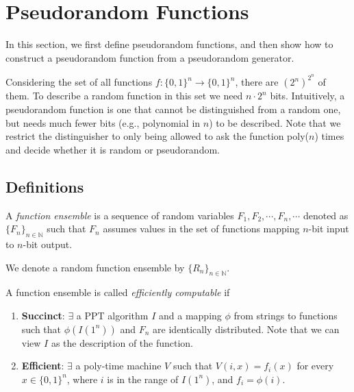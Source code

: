 \section{Pseudorandom Functions}
In this section, we first define pseudorandom functions, and then show how to  construct a pseudorandom function from a pseudorandom generator.

Considering the set of all functions $f: \{0, 1\}^n \rightarrow \{0, 1\}^n$, there are $(2^n)^{2^n}$ of them.
To describe a random function in this set we need $n \cdot 2^n$ bits.
Intuitively, a pseudorandom function is one that cannot be distinguished from a random one,
but needs much fewer bits (e.g., polynomial in $n$) to be described.
Note that we restrict the distinguisher to only being allowed to ask the function poly($n$) times and decide whether it is random or pseudorandom.

\subsection{Definitions}

\begin{definition}
A \emph{function ensemble} is a sequence of random variables $F_1, F_2, \cdots, F_n, \cdots$ denoted as $\{F_n\}_{n \in \mathbb{N}}$ such that
$F_n$ assumes values in the set of functions mapping $n$-bit input to $n$-bit output.
\end{definition}

\begin{definition}
We denote a random function ensemble by $\{R_n\}_{n \in \mathbb{N}}$.
\end{definition}

\begin{definition}
A function ensemble is called \emph{efficiently computable} if
\begin{enumerate}[label=(\alph*)]
    \item \textbf{Succinct}:
        $\exists$ a PPT algorithm $I$ and a mapping $\phi$ from strings to functions such that
        $\phi(I(1^n))$ and $F_n$ are identically distributed.
        Note that we can view $I$ as the description of the function.
    \item \textbf{Efficient}:
        $\exists$ a poly-time machine $V$ such that
        $V(i, x) = f_i(x)$ for every $x \in \{0, 1\}^n$, where $i$ is in the range of $I(1^n)$, and $f_i = \phi(i)$.
\end{enumerate}
\end{definition}

